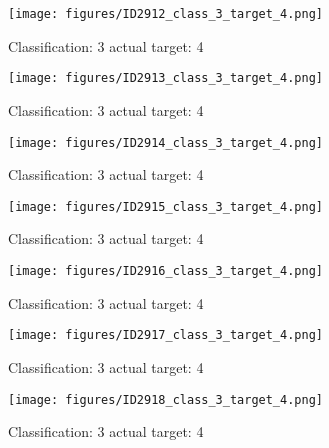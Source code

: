 \begin{figure}[h!]
\begin{center}
\texttt{[image: figures/ID2912\_class\_3\_target\_4.png]}
\end{center}
\caption{ Classification: 3 actual target: 4}
\label{fig:ID2912_class_3_target_4}
\end{figure}
\begin{figure}[h!]
\begin{center}
\texttt{[image: figures/ID2913\_class\_3\_target\_4.png]}
\end{center}
\caption{ Classification: 3 actual target: 4}
\label{fig:ID2913_class_3_target_4}
\end{figure}
\begin{figure}[h!]
\begin{center}
\texttt{[image: figures/ID2914\_class\_3\_target\_4.png]}
\end{center}
\caption{ Classification: 3 actual target: 4}
\label{fig:ID2914_class_3_target_4}
\end{figure}
\begin{figure}[h!]
\begin{center}
\texttt{[image: figures/ID2915\_class\_3\_target\_4.png]}
\end{center}
\caption{ Classification: 3 actual target: 4}
\label{fig:ID2915_class_3_target_4}
\end{figure}
\begin{figure}[h!]
\begin{center}
\texttt{[image: figures/ID2916\_class\_3\_target\_4.png]}
\end{center}
\caption{ Classification: 3 actual target: 4}
\label{fig:ID2916_class_3_target_4}
\end{figure}
\begin{figure}[h!]
\begin{center}
\texttt{[image: figures/ID2917\_class\_3\_target\_4.png]}
\end{center}
\caption{ Classification: 3 actual target: 4}
\label{fig:ID2917_class_3_target_4}
\end{figure}
\begin{figure}[h!]
\begin{center}
\texttt{[image: figures/ID2918\_class\_3\_target\_4.png]}
\end{center}
\caption{ Classification: 3 actual target: 4}
\label{fig:ID2918_class_3_target_4}
\end{figure}
